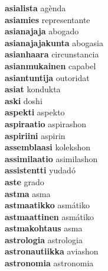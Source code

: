 \textbf{asialista } agènda \\
\textbf{asiamies } representante \\
\textbf{asianajaja } abogado \\
\textbf{asianajajakunta } abogasia \\
\textbf{asianhaara } circunstancia \\
\textbf{asianmukainen } capabel \\
\textbf{asiantuntija } outoridat \\
\textbf{asiat } kondukta \\
\textbf{aski } doshi \\
\textbf{aspekti } aspekto \\
\textbf{aspiraatio } aspirashon \\
\textbf{aspiriini } aspirin \\
\textbf{assemblaasi } kolekshon \\
\textbf{assimilaatio } asimilashon \\
\textbf{assistentti } yudadó \\
\textbf{aste } grado \\
\textbf{astma } asma \\
\textbf{astmaatikko } asmátiko \\
\textbf{astmaattinen } asmátiko \\
\textbf{astmakohtaus } asma \\
\textbf{astrologia } astrologia \\
\textbf{astronautiikka } aviashon \\
\textbf{astronomia } astronomia \\
